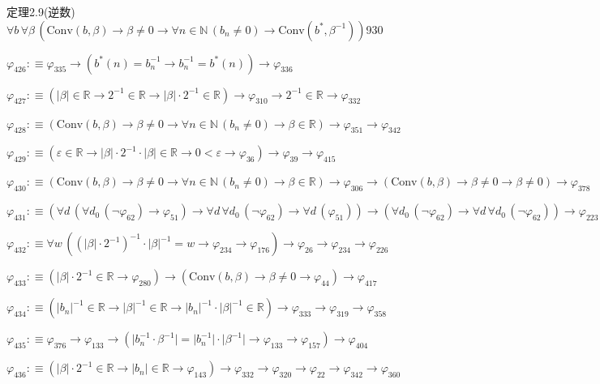 \begin{fullproof}{定理2.9(逆数)}{$\forall b\,\forall \beta\,(\mathrm{Conv}(b,\beta) \to \beta \neq 0 \to \forall n \in \mathbb{N}\,(b_{n} \neq 0) \to \mathrm{Conv}(b^{\ast},\beta^{-1}))$}{930}
\begin{abbrevlist}
\item $\varphi_{426} :\equiv \varphi_{335} \to (b^{\ast}(n) = b_{n}^{-1} \to b_{n}^{-1} = b^{\ast}(n)) \to \varphi_{336}$
\item $\varphi_{427} :\equiv (\lvert \beta \rvert \in \mathbb{R} \to 2^{-1} \in \mathbb{R} \to \lvert \beta \rvert \cdot 2^{-1} \in \mathbb{R}) \to \varphi_{310} \to 2^{-1} \in \mathbb{R} \to \varphi_{332}$
\item $\varphi_{428} :\equiv (\mathrm{Conv}(b,\beta) \to \beta \neq 0 \to \forall n \in \mathbb{N}\,(b_{n} \neq 0) \to \beta \in \mathbb{R}) \to \varphi_{351} \to \varphi_{342}$
\item $\varphi_{429} :\equiv (\varepsilon \in \mathbb{R} \to \lvert \beta \rvert \cdot 2^{-1} \cdot \lvert \beta \rvert \in \mathbb{R} \to 0 < \varepsilon \to \varphi_{36}) \to \varphi_{39} \to \varphi_{415}$
\item $\varphi_{430} :\equiv (\mathrm{Conv}(b,\beta) \to \beta \neq 0 \to \forall n \in \mathbb{N}\,(b_{n} \neq 0) \to \beta \in \mathbb{R}) \to \varphi_{306} \to (\mathrm{Conv}(b,\beta) \to \beta \neq 0 \to \beta \neq 0) \to \varphi_{378}$
\item $\varphi_{431} :\equiv (\forall d\,(\forall d_{0}\,(\neg \varphi_{62}) \to \varphi_{51}) \to \forall d\,\forall d_{0}\,(\neg \varphi_{62}) \to \forall d\,(\varphi_{51})) \to (\forall d_{0}\,(\neg \varphi_{62}) \to \forall d\,\forall d_{0}\,(\neg \varphi_{62})) \to \varphi_{223}$
\item $\varphi_{432} :\equiv \forall w\,((\lvert \beta \rvert \cdot 2^{-1})^{-1} \cdot \lvert \beta \rvert^{-1} = w \to \varphi_{234} \to \varphi_{176}) \to \varphi_{26} \to \varphi_{234} \to \varphi_{226}$
\item $\varphi_{433} :\equiv (\lvert \beta \rvert \cdot 2^{-1} \in \mathbb{R} \to \varphi_{280}) \to (\mathrm{Conv}(b,\beta) \to \beta \neq 0 \to \varphi_{44}) \to \varphi_{417}$
\item $\varphi_{434} :\equiv (\lvert b_{n} \rvert^{-1} \in \mathbb{R} \to \lvert \beta \rvert^{-1} \in \mathbb{R} \to \lvert b_{n} \rvert^{-1} \cdot \lvert \beta \rvert^{-1} \in \mathbb{R}) \to \varphi_{333} \to \varphi_{319} \to \varphi_{358}$
\item $\varphi_{435} :\equiv \varphi_{376} \to \varphi_{133} \to (\lvert b_{n}^{-1} \cdot \beta^{-1} \rvert = \lvert b_{n}^{-1} \rvert \cdot \lvert \beta^{-1} \rvert \to \varphi_{133} \to \varphi_{157}) \to \varphi_{404}$
\item $\varphi_{436} :\equiv (\lvert \beta \rvert \cdot 2^{-1} \in \mathbb{R} \to \lvert b_{n} \rvert \in \mathbb{R} \to \varphi_{143}) \to \varphi_{332} \to \varphi_{320} \to \varphi_{22} \to \varphi_{342} \to \varphi_{360}$

\end{abbrevlist}
\end{fullproof}
